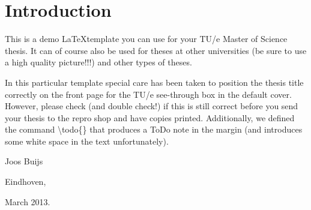 \chapter{Introduction}\label{chapter:introduction}

This is a demo \LaTeX template you can use for your TU/e Master of Science thesis. It can of course also be used for theses at other universities (be sure to use a high quality picture!!!) and other types of theses.

In this particular template special care has been taken to position the thesis title correctly on the front page for the TU/e see-through box in the default cover. However, please check (and double check!) if this is still correct before you send your thesis to the repro shop and have copies printed. Additionally, we defined the command \textbackslash todo\{\} that produces a  ToDo note in the margin (and introduces some white space in the text unfortunately).


\vspace{10pt}

Joos Buijs

Eindhoven,

March 2013.